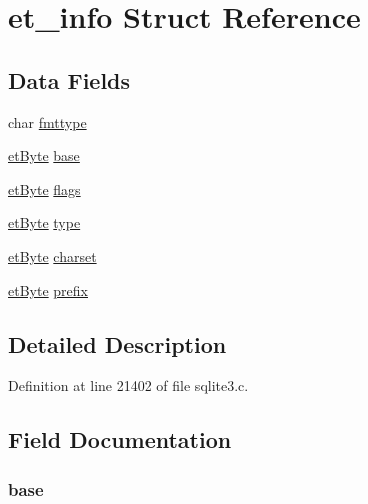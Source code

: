 \hypertarget{structet__info}{}\section{et\+\_\+info Struct Reference}
\label{structet__info}
\subsection*{Data Fields}
\begin{DoxyCompactItemize}
\item 
char \hyperlink{structet__info_abc4be73f6d5df29d7eeabfa0d62dc266}{fmttype}
\item 
\hyperlink{sqlite3_8c_a91e852579d0a29e4b91b94e8e4d015b9}{et\+Byte} \hyperlink{structet__info_a79b1c47fac89c8db2d979ee5c14295fc}{base}
\item 
\hyperlink{sqlite3_8c_a91e852579d0a29e4b91b94e8e4d015b9}{et\+Byte} \hyperlink{structet__info_aec05ac8ae1d08a09ab890a2e82e2d2a7}{flags}
\item 
\hyperlink{sqlite3_8c_a91e852579d0a29e4b91b94e8e4d015b9}{et\+Byte} \hyperlink{structet__info_a13133dd686ddd2d9d5e85aece7d29e3c}{type}
\item 
\hyperlink{sqlite3_8c_a91e852579d0a29e4b91b94e8e4d015b9}{et\+Byte} \hyperlink{structet__info_a8c4ec44bc9dcbbfe94be13508b083c9c}{charset}
\item 
\hyperlink{sqlite3_8c_a91e852579d0a29e4b91b94e8e4d015b9}{et\+Byte} \hyperlink{structet__info_a2925ae756413820fcf5893cee85301c8}{prefix}
\end{DoxyCompactItemize}


\subsection{Detailed Description}


Definition at line 21402 of file sqlite3.\+c.



\subsection{Field Documentation}
\hypertarget{structet__info_a79b1c47fac89c8db2d979ee5c14295fc}{}
\subsubsection[{base}]{ base}\label{structet__info_a79b1c47fac89c8db2d979ee5c14295fc}


